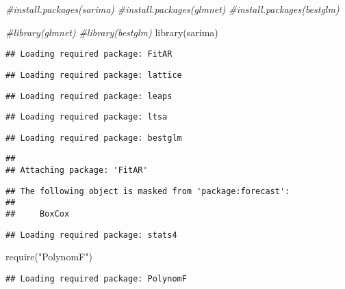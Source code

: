 \documentclass[
]{article}
\newenvironment{Shaded}{\begin{snugshade}}{\end{snugshade}}
\newcommand{\CommentTok}[1]{\textcolor[rgb]{0.56,0.35,0.01}{\textit{#1}}}
\newcommand{\FunctionTok}[1]{\textcolor[rgb]{0.00,0.00,0.00}{#1}}
\newcommand{\NormalTok}[1]{#1}
\newcommand{\StringTok}[1]{\textcolor[rgb]{0.31,0.60,0.02}{#1}}
\begin{document}
\begin{Shaded}
\begin{Highlighting}[]
\CommentTok{\#install.packages(sarima)}
\CommentTok{\#install.packages(glmnet)}
\CommentTok{\#install.packages(bestglm)}

\CommentTok{\#library(glmnet)}
\CommentTok{\#library(bestglm)}
\FunctionTok{library}\NormalTok{(sarima)}
\end{Highlighting}
\end{Shaded}

\begin{verbatim}
## Loading required package: FitAR
\end{verbatim}

\begin{verbatim}
## Loading required package: lattice
\end{verbatim}

\begin{verbatim}
## Loading required package: leaps
\end{verbatim}

\begin{verbatim}
## Loading required package: ltsa
\end{verbatim}

\begin{verbatim}
## Loading required package: bestglm
\end{verbatim}

\begin{verbatim}
## 
## Attaching package: 'FitAR'
\end{verbatim}

\begin{verbatim}
## The following object is masked from 'package:forecast':
## 
##     BoxCox
\end{verbatim}

\begin{verbatim}
## Loading required package: stats4
\end{verbatim}

\begin{Shaded}
\begin{Highlighting}[]
\FunctionTok{require}\NormalTok{(}\StringTok{"PolynomF"}\NormalTok{)}
\end{Highlighting}
\end{Shaded}

\begin{verbatim}
## Loading required package: PolynomF
\end{verbatim}
\end{document}
